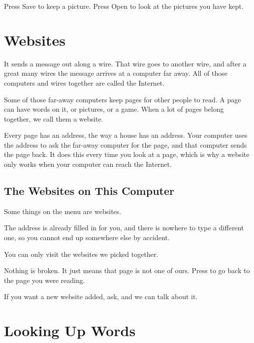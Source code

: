 \documentclass[12pt,oneside,paper=5.5in:8.5in,DIV=11,chapterprefix=false,headings=big]{scrbook}
\begin{document}
Press Save to keep a picture.
Press Open to look at the pictures you have kept.

\chaptericon{\faGlobeAmericas}
\chapter{Websites}


It sends a message out along a wire.
That wire goes to another wire,
and after a great many wires
the message arrives at a computer far away.
All of those computers and wires together
are called the Internet.

Some of those far-away computers keep pages
for other people to read.
A page can have words on it, or pictures, or a game.
When a lot of pages belong together,
we call them a website.

Every page has an address,
the way a house has an address.
Your computer uses the address to ask
the far-away computer for the page,
and that computer sends the page back.
It does this every time you look at a page,
which is why a website only works
when your computer can reach the Internet.

\section{The Websites on This Computer}

Some things on the menu are websites.

The address is already filled in for you,
and there is nowhere to type a different one,
so you cannot end up somewhere else by accident.

You can only visit the websites we picked together.

\begin{heads}
Nothing is broken. It just means that page is not one of ours.
Press  to go back to the page you were reading.
\end{heads}

If you want a new website added,
ask, and we can talk about it.

\chaptericon{\faBookOpen}
\chapter{Looking Up Words}
\end{document}
